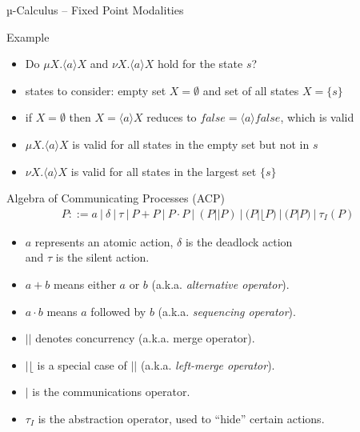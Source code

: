 \documentclass[aspectratio=1610]{beamer}
\begin{document}
  \begin{frame}{µ-Calculus – Fixed Point Modalities}
    \begin{exampleblock}{Example}
      \begin{center}
      \end{center}
      \begin{itemize}
        \item Do $\mu X. \langle a \rangle X$ and $\nu X. \langle a \rangle X$ hold for the state $s$?
        \item states to consider: empty set $X = \emptyset$ and set of all states $X = \{s\}$
        \item if $X = \emptyset$ then $X = \langle a \rangle X$ reduces to $\mathit{false} = \langle a \rangle \mathit{false}$, which is valid
        \item $\mu X. \langle a \rangle X$ is valid for all states in the empty set but not in $s$
        \item $\nu X. \langle a \rangle X$ is valid for all states in the largest set $\{s\}$
      \end{itemize}
    \end{exampleblock}
  \end{frame}


  \begin{frame}{Algebra of Communicating Processes (ACP)}
    \begin{align*}
      P ::= a\ |\ \delta\ |\ \tau\ |\ P + P\ |\ P \cdot P\ |\ (P || P)\ |\ (P |\lfloor P)\ |\ (P | P)\ |\ \tau_I(P)
    \end{align*}

    \begin{itemize}
      \item $a$ represents an atomic action, $\delta$ is the deadlock action \\ and $\tau$ is the silent action.
      \item $a + b$ means either $a$ or $b$ (a.k.a. \textit{alternative operator}).
      \item $a \cdot b$ means $a$ followed by $b$ (a.k.a. \textit{sequencing operator}).
      \item $||$ denotes concurrency (a.k.a. merge operator).
      \item $|\lfloor$ is a special case of $||$ (a.k.a. \textit{left-merge operator}).
      \item $|$ is the communications operator.
      \item $\tau_I$ is the abstraction operator, used to “hide” certain actions.
    \end{itemize}
  \end{frame}
\end{document}
